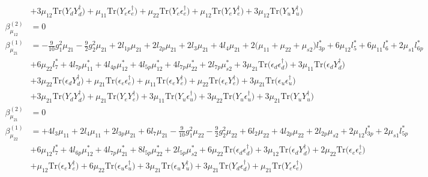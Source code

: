 {\begin{align}
 &+3 \mu_{12} \mbox{Tr}\Big({Y_d  Y_{d}^{\dagger}}\Big) +\mu_{11} \mbox{Tr}\Big({Y_e  \epsilon_{e}^{\dagger}}\Big) +\mu_{22} \mbox{Tr}\Big({Y_e  \epsilon_{e}^{\dagger}}\Big) +\mu_{12} \mbox{Tr}\Big({Y_e  Y_{e}^{\dagger}}\Big) +3 \mu_{12} \mbox{Tr}\Big({Y_u  Y_{u}^{\dagger}}\Big) \\ 
\beta_{\mu_{12}}^{(2)} & =  
0\\ 
\beta_{\mu_{21}}^{(1)} & =  
-\frac{9}{10} g_{1}^{2} \mu_{21} -\frac{9}{2} g_{2}^{2} \mu_{21} +2 l_{1p} \mu_{21} +2 l_{2p} \mu_{21} +2 l_3 \mu_{21} +4 l_4 \mu_{21} +2 \Big(\mu_{11} + \mu_{22} + \mu_{s2}\Big)l_{3p}^* +6 \mu_{12} l_5^* +6 \mu_{11} l_6^* +2 \mu_{s1} l_{6p}^* \nonumber \\ 
 &+6 \mu_{22} l_7^* +4 l_{7p} \mu_{11}^* +4 l_{4p} \mu_{12}^* +4 l_{5p} \mu_{12}^* +4 l_{7p} \mu_{22}^* +2 l_{7p} \mu_{s2}^* +3 \mu_{21} \mbox{Tr}\Big({\epsilon_d  \epsilon_{d}^{\dagger}}\Big) +3 \mu_{11} \mbox{Tr}\Big({\epsilon_d  Y_{d}^{\dagger}}\Big) \nonumber \\ 
 &+3 \mu_{22} \mbox{Tr}\Big({\epsilon_d  Y_{d}^{\dagger}}\Big) +\mu_{21} \mbox{Tr}\Big({\epsilon_e  \epsilon_{e}^{\dagger}}\Big) +\mu_{11} \mbox{Tr}\Big({\epsilon_e  Y_{e}^{\dagger}}\Big) +\mu_{22} \mbox{Tr}\Big({\epsilon_e  Y_{e}^{\dagger}}\Big) +3 \mu_{21} \mbox{Tr}\Big({\epsilon_u  \epsilon_{u}^{\dagger}}\Big) \nonumber \\ 
 &+3 \mu_{21} \mbox{Tr}\Big({Y_d  Y_{d}^{\dagger}}\Big) +\mu_{21} \mbox{Tr}\Big({Y_e  Y_{e}^{\dagger}}\Big) +3 \mu_{11} \mbox{Tr}\Big({Y_u  \epsilon_{u}^{\dagger}}\Big) +3 \mu_{22} \mbox{Tr}\Big({Y_u  \epsilon_{u}^{\dagger}}\Big) +3 \mu_{21} \mbox{Tr}\Big({Y_u  Y_{u}^{\dagger}}\Big) \\ 
\beta_{\mu_{21}}^{(2)} & =  
0\\ 
\beta_{\mu_{22}}^{(1)} & =  
+4 l_3 \mu_{11} +2 l_4 \mu_{11} +2 l_{3p} \mu_{21} +6 l_7 \mu_{21} -\frac{9}{10} g_{1}^{2} \mu_{22} -\frac{9}{2} g_{2}^{2} \mu_{22} +6 l_2 \mu_{22} +4 l_{2p} \mu_{22} +2 l_{2p} \mu_{s2} +2 \mu_{12} l_{3p}^* +2 \mu_{s1} l_{5p}^* \nonumber \\ 
 &+6 \mu_{12} l_7^* +4 l_{6p} \mu_{12}^* +4 l_{7p} \mu_{21}^* +8 l_{5p} \mu_{22}^* +2 l_{5p} \mu_{s2}^* +6 \mu_{22} \mbox{Tr}\Big({\epsilon_d  \epsilon_{d}^{\dagger}}\Big) +3 \mu_{12} \mbox{Tr}\Big({\epsilon_d  Y_{d}^{\dagger}}\Big) +2 \mu_{22} \mbox{Tr}\Big({\epsilon_e  \epsilon_{e}^{\dagger}}\Big) \nonumber \\ 
 &+\mu_{12} \mbox{Tr}\Big({\epsilon_e  Y_{e}^{\dagger}}\Big) +6 \mu_{22} \mbox{Tr}\Big({\epsilon_u  \epsilon_{u}^{\dagger}}\Big) +3 \mu_{21} \mbox{Tr}\Big({\epsilon_u  Y_{u}^{\dagger}}\Big) +3 \mu_{21} \mbox{Tr}\Big({Y_d  \epsilon_{d}^{\dagger}}\Big) +\mu_{21} \mbox{Tr}\Big({Y_e  \epsilon_{e}^{\dagger}}\Big) \nonumber \\ 

\end{align}}
